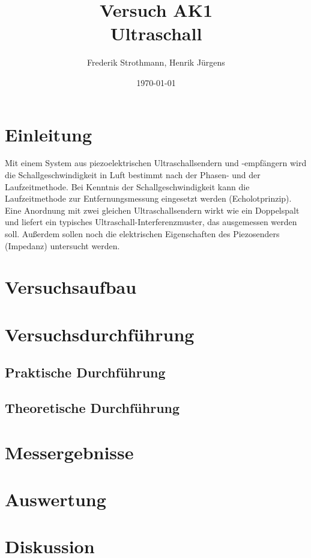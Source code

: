 \documentclass[12pt]{scrartcl}
\title{Versuch AK1\\ Ultraschall}
\author{Frederik Strothmann, Henrik Jürgens}
\date{\today}
\begin{document}

\maketitle
\tableofcontents
\newpage


\section{Einleitung}
Mit einem System aus piezoelektrischen Ultraschallsendern und -empfängern wird die Schallgeschwindigkeit in Luft
bestimmt nach der Phasen- und der Laufzeitmethode. Bei Kenntnis der Schallgeschwindigkeit kann die Laufzeitmethode zur Entfernungsmessung eingesetzt werden (Echolotprinzip). Eine Anordnung mit zwei gleichen Ultraschallsendern wirkt wie ein Doppelspalt und liefert ein typisches
Ultraschall-Interferenzmuster, das ausgemessen werden soll.
Außerdem sollen noch die elektrischen Eigenschaften des Piezosenders (Impedanz) untersucht werden.


\section{Versuchsaufbau}


\section{Versuchsdurchführung}


\subsection{Praktische Durchführung}


\subsection{Theoretische Durchführung}


\section{Messergebnisse}



\section{Auswertung}


\section{Diskussion}


\end{document}
